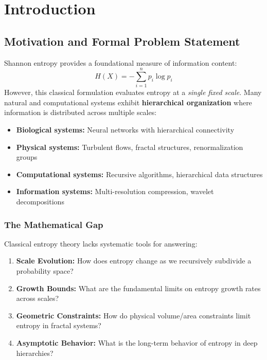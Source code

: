\documentclass[11pt,a4paper]{article}
\theoremstyle{definition}
\theoremstyle{remark}
\begin{document}
\section{Introduction}
\label{sec:intro}

\subsection{Motivation and Formal Problem Statement}
\label{subsec:motivation}

Shannon entropy \cite{shannon1948} provides a foundational measure of information content:
\begin{equation}
    H(X) = -\sum_{i=1}^{n} p_i \log p_i
    \label{eq:shannon}
\end{equation}
However, this classical formulation evaluates entropy at a \emph{single fixed scale}. Many natural and computational systems exhibit \textbf{hierarchical organization} where information is distributed across multiple scales:

\begin{itemize}[nosep]
    \item \textbf{Biological systems:} Neural networks with hierarchical connectivity
    \item \textbf{Physical systems:} Turbulent flows, fractal structures, renormalization groups
    \item \textbf{Computational systems:} Recursive algorithms, hierarchical data structures
    \item \textbf{Information systems:} Multi-resolution compression, wavelet decompositions
\end{itemize}

\subsubsection{The Mathematical Gap}

Classical entropy theory lacks systematic tools for answering:

\begin{enumerate}
    \item \textbf{Scale Evolution:} How does entropy change as we recursively subdivide a probability space?
    \item \textbf{Growth Bounds:} What are the fundamental limits on entropy growth rates across scales?
    \item \textbf{Geometric Constraints:} How do physical volume/area constraints limit entropy in fractal systems?
    \item \textbf{Asymptotic Behavior:} What is the long-term behavior of entropy in deep hierarchies?
\end{enumerate}
\end{document}

